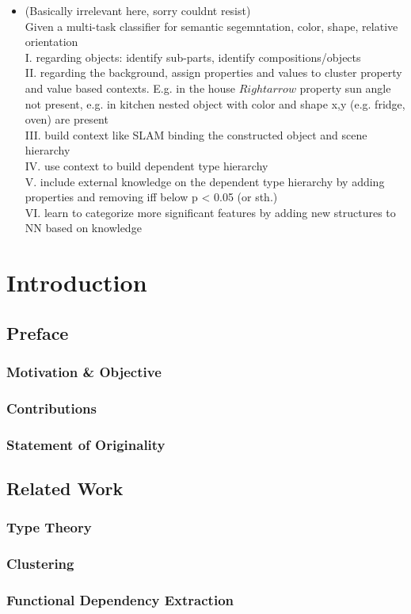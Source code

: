 \begin{itemize}
    \item (Basically irrelevant here, sorry couldnt resist) \\
    Given a multi-task classifier for semantic segemntation, color, shape, relative orientation \\ 
    I. regarding objects: identify sub-parts, identify compositions/objects \\
    II. regarding the background, assign properties and values to cluster property and value based contexts. E.g. in the house $Rightarrow$ property sun angle not present, e.g. in kitchen nested object with color and shape x,y (e.g. fridge, oven) are present \\
    III. build context like SLAM binding the constructed object and scene hierarchy \\
    IV. use context to build dependent type hierarchy \\
    V. include external knowledge on the dependent type hierarchy by adding properties and removing iff below p < 0.05 (or sth.) \\
    VI. learn to categorize more significant features by adding new structures to NN based on knowledge \\
\end{itemize}


\chapter{Introduction}
\section{Preface}

\subsection{Motivation \& Objective}

\subsection{Contributions}
\subsection{Statement of Originality}
\newpage


\section{Related Work}
\subsection{Type Theory}
\subsection{Clustering}
\subsection{Functional Dependency Extraction}
